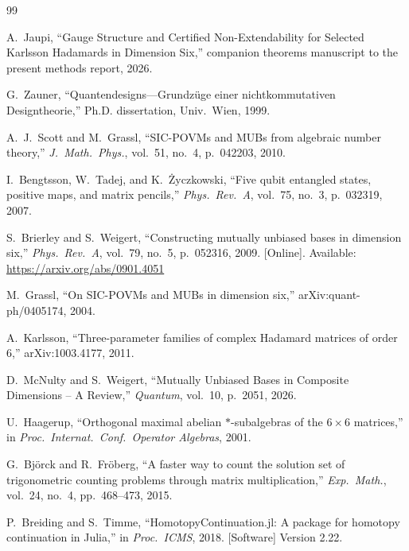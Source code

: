 \documentclass[onecolumn]{IEEEtran}
\begin{document}
\begin{thebibliography}{99}

A.~Jaupi, ``Gauge Structure and Certified Non-Extendability for Selected Karlsson Hadamards in Dimension Six,'' companion theorems manuscript to the present methods report, 2026.

G.~Zauner, ``Quantendesigns---Grundz\"uge einer nichtkommutativen Designtheorie,'' Ph.D. dissertation, Univ.\ Wien, 1999.

A.~J.~Scott and M.~Grassl, ``SIC-POVMs and MUBs from algebraic number theory,'' \emph{J.\ Math.\ Phys.}, vol.~51, no.~4, p.~042203, 2010.

I.~Bengtsson, W.~Tadej, and K.~\.Zyczkowski, ``Five qubit entangled states, positive maps, and matrix pencils,'' \emph{Phys.\ Rev.\ A}, vol.~75, no.~3, p.~032319, 2007.

S.~Brierley and S.~Weigert, ``Constructing mutually unbiased bases in dimension six,'' \emph{Phys.\ Rev.\ A}, vol.~79, no.~5, p.~052316, 2009. [Online]. Available: \url{https://arxiv.org/abs/0901.4051}

M.~Grassl, ``On SIC-POVMs and MUBs in dimension six,'' arXiv:quant-ph/0405174, 2004.

A.~Karlsson, ``Three-parameter families of complex Hadamard matrices of order 6,'' arXiv:1003.4177, 2011.

D.~McNulty and S.~Weigert, ``Mutually Unbiased Bases in Composite Dimensions -- A Review,'' \emph{Quantum}, vol.~10, p.~2051, 2026.

U.~Haagerup, ``Orthogonal maximal abelian $*$-subalgebras of the $6\times6$ matrices,'' in \emph{Proc.\ Internat.\ Conf.\ Operator Algebras}, 2001.

G.~Bj\"orck and R.~Fr\"oberg, ``A faster way to count the solution set of trigonometric counting problems through matrix multiplication,'' \emph{Exp.\ Math.}, vol.~24, no.~4, pp.~468--473, 2015.

P.~Breiding and S.~Timme, ``HomotopyContinuation.jl: A package for homotopy continuation in Julia,'' in \emph{Proc.\ ICMS}, 2018. [Software] Version 2.22.

\end{thebibliography}
\end{document}
